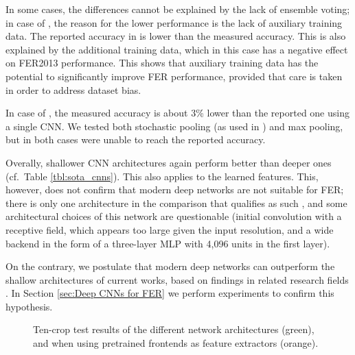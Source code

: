 \documentclass[conference,10pt,a4paper]{IEEEtran}
\begin{document}
In some cases, the differences cannot be explained by the lack of ensemble voting; in case of \cite{zhang2015}, the reason for the lower performance is the lack of auxiliary training data. The reported accuracy in \cite{mollahosseini15} is lower than the measured accuracy. This is also explained by the additional training data, which in this case has a negative effect on FER2013 performance. This shows that auxiliary training data has the potential to significantly improve FER performance, provided that care is taken in order to address dataset bias.

In case of \cite{yu15}, the measured accuracy is about 3\% lower than the reported one using a single CNN. We tested both stochastic pooling (as used in \cite{yu15}) and max pooling, but in both cases were unable to reach the reported accuracy.

Overally, shallower CNN architectures again perform better than deeper ones (cf.\ Table \ref{tbl:sota_cnns}). This also applies to the learned features. This, however, does not confirm that modern deep networks are not suitable for FER; there is only one architecture in the comparison that qualifies as such \cite{mollahosseini15}, and some architectural choices of this network are questionable (initial convolution with a  receptive field, which appears too large given the input resolution, and a wide backend in the form of a three-layer MLP with 4,096 units in the first layer).

On the contrary, we postulate that modern deep networks can outperform the shallow architectures of current works, based on findings in related research fields \cite{schroff15,he15}. In Section \ref{sec:Deep CNNs for FER} we perform experiments to confirm this hypothesis.

\begin{figure}[t]
\begin{center}
\end{center}
\caption{Ten-crop test results of the different network architectures (green), and when using pretrained frontends as feature extractors (orange).}
\label{fig:related-perf}
\end{figure}
\end{document}

